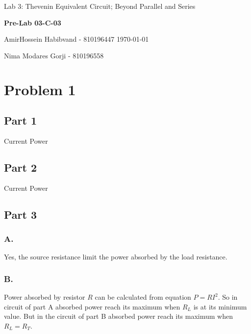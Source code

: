 \documentclass{report}
\begin{document}
    {\large Lab 3: Thevenin Equivalent Circuit; Beyond Parallel and Series }
    \hfill
    {\large \textbf{Pre-Lab 03-C-03} \par}
	\vspace{0.1in}
    {\large AmirHossein Habibvand - 810196447}
    \hfill
    \today \par
    {\large Nima Modares Gorji - 810196558 \par}
	\vspace{0.5in}

    \section*{Problem 1}
        \begin{multicols}{2}
            \subsection*{Part 1}
                \begin{center}
                    Current
                    \scalebox{0.5}{}
                    Power
                    \scalebox{0.5}{}
                \end{center}
            \vfill\null
            \columnbreak
                \subsection*{Part 2}
                \begin{center}
                    Current
                    \scalebox{0.5}{}
                    Power
                    \scalebox{0.5}{}
                \end{center}
        \end{multicols}
        \subsection*{Part 3}
            \subsubsection*{A.}
                Yes,  the source resistance limit the power absorbed by the load resistance.
            \subsubsection*{B.}
                Power absorbed by resistor $R$ can be calculated from equation $P = R I^2$.
                So in circuit of part A absorbed power reach its maximum when $R_L$ is at its minimum value.
                But in the circuit of part B absorbed power reach its maximum when $R_L = R_T$.
\end{document}
